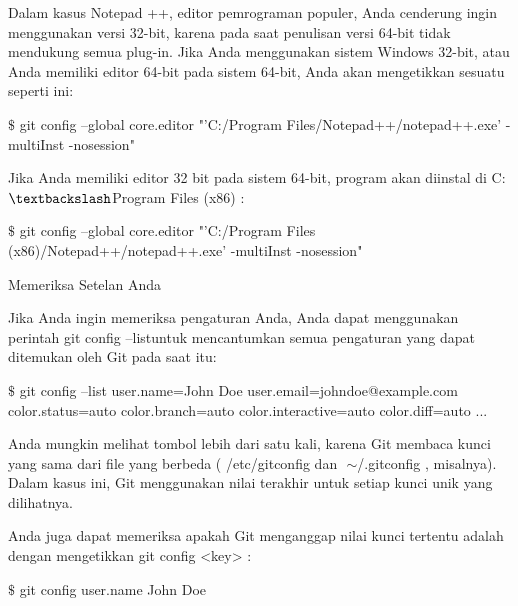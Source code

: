 \noindent 
Dalam kasus Notepad ++, editor pemrograman populer, Anda cenderung ingin menggunakan versi 32-bit, karena pada saat penulisan versi 64-bit tidak mendukung semua plug-in. $  $Jika Anda menggunakan sistem Windows 32-bit, atau Anda memiliki editor 64-bit pada sistem 64-bit, Anda akan mengetikkan sesuatu seperti ini: \par
\vspace{12pt}
\noindent 
  $  \$  $ git config --global core.editor "'C:/Program Files/Notepad++/notepad++.exe' -multiInst -nosession"  \par
\vspace{12pt}
\noindent 
Jika Anda memiliki editor 32 bit pada sistem 64-bit, program akan diinstal di $  $C: $  \textbackslash  $Program Files (x86) $  $: \par
\vspace{12pt}
\noindent 
  $  \$  $ git config --global core.editor "'C:/Program Files (x86)/Notepad++/notepad++.exe' -multiInst -nosession"  \par
\noindent 
Memeriksa Setelan Anda \par
\vspace{12pt}
\noindent 
Jika Anda ingin memeriksa pengaturan Anda, Anda dapat menggunakan perintah $  $git config --listuntuk mencantumkan semua pengaturan yang dapat ditemukan oleh Git pada saat itu: \par
\vspace{12pt}
\noindent 
  $  \$  $ git config --list user.name=John Doe user.email=johndoe@example.com color.status=auto color.branch=auto color.interactive=auto color.diff=auto ...  \par
\vspace{12pt}
\noindent 
Anda mungkin melihat tombol lebih dari satu kali, karena Git membaca kunci yang sama dari file yang berbeda ( $  $/etc/gitconfig $  $dan $  $ $  \sim  $/.gitconfig $  $, misalnya). $  $Dalam kasus ini, Git menggunakan nilai terakhir untuk setiap kunci unik yang dilihatnya. \par
\vspace{12pt}
\noindent 
Anda juga dapat memeriksa apakah Git menganggap nilai kunci tertentu adalah dengan mengetikkan $  $git config <key> $  $: \par
\vspace{12pt}
\noindent 
  $  \$  $ git config user.name John Doe  \par
\vspace{12pt}
\vspace{12pt}
\vspace{12pt}

